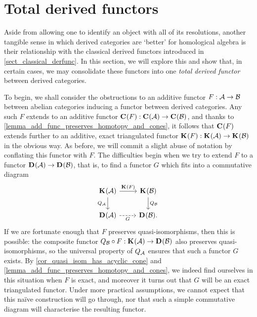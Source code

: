 \section{Total derived functors}
\label{sect_derfunc}

Aside from allowing one to identify an object with all of its
resolutions, another tangible sense in which derived categories are
`better' for homological algebra is their relationship with the
classical derived functors introduced in \cref{sect_classical_derfunc}.
In this section, we will explore this and show that, in certain
cases, we may consolidate these functors into one \emph{total derived
functor} between derived categories.
\iffalse
For our purposes, it will be sufficient only to go far enough to see
what happens for Ext and Tor.
\fi

To begin, we shall consider the obstructions to an additive functor
$F: \mathcal{A} \to \mathcal{B}$ between abelian categories inducing a
functor between derived categories.
Any such $F$ extends to an additive functor ${\mathbf{C}}^{{}}({F}): {\mathbf{C}}^{{}}({\mathcal{A}})
\to {\mathbf{C}}^{{}}({\mathcal{B}})$, and thanks to
\cref{lemma_add_func_preserves_homotopy_and_cones}, it follows that
${\mathbf{C}}^{{}}({F})$ extends further to an additive, exact triangulated functor
${\mathbf{K}}^{{}}({F}): {\mathbf{K}}^{{}}({\mathcal{A}}) \to {\mathbf{K}}^{{}}({\mathcal{B}})$ in the obvious way.
As before, we will commit a slight abuse of notation by conflating
this functor with $F$.
The difficulties begin when we try to extend $F$ to a functor
${\mathbf{D}}^{{}}({\mathcal{A}}) \to {\mathbf{D}}^{{}}({\mathcal{B}})$, that is, to find a
functor $G$ which fits into a commutative diagram
\[
  \begin{tikzcd}
    \homcat{\abcat{A}} & \homcat{\abcat{B}} \\
    \dercat{\abcat{A}} & \dercat{\abcat{B}}.
    \arrow["{\homcat{F}}", from=1-1, to=1-2]
    \arrow["{Q_{\abcat{A}}}"', from=1-1, to=2-1]
    \arrow["{Q_{\abcat{B}}}", from=1-2, to=2-2]
    \arrow["{G}"', dashed, from=2-1, to=2-2]
  \end{tikzcd}
\]
If we are fortunate enough that $F$ preserves quasi-isomorphisms,
then this is possible:
the composite functor $Q_{\mathcal{B}} \circ F: {\mathbf{K}}^{{}}({\mathcal{A}}) \to
{\mathbf{D}}^{{}}({\mathcal{B}})$ also preserves quasi-isomorphisms, so the
universal property of $Q_{\mathcal{A}}$ ensures that such a functor $G$ exists.
By \cref{cor_quasi_isom_has_acyclic_cone} and
\cref{lemma_add_func_preserves_homotopy_and_cones}, we indeed find
ourselves in this situation when $F$ is exact, and moreover it turns
out that $G$ will be an exact triangulated functor.
Under more practical assumptions, we cannot expect that this
na\"{i}ve construction will go through, nor that such a simple
commutative diagram will characterise the resulting functor.

